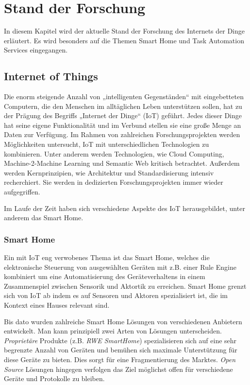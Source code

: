 \chapter{Stand der Forschung}
In diesem Kapitel wird der aktuelle Stand der Forschung des Internets der Dinge erläutert. Es wird besonders auf die Themen Smart Home und Task Automation Services eingegangen.


\section{Internet of Things}
Die enorm steigende Anzahl von „intelligenten Gegenständen“ mit eingebetteten Computern, die den Menschen im alltäglichen Leben unterstützen sollen, hat zu der Prägung des Begriffs „Internet der Dinge“ (IoT) geführt. Jedes dieser Dinge hat seine eigene Funktionalität und im Verbund stellen sie eine große Menge an Daten zur Verfügung. Im Rahmen von zahlreichen Forschungsprojekten \cite{ierc:portfolios} werden Möglichkeiten untersucht, IoT mit unterschiedlichen Technologien zu kombinieren. Unter anderem werden Technologien, wie Cloud Computing, Machine-2-Machine Learning und Semantic Web kritisch betrachtet. Außerdem werden Kernprinzipien, wie Architektur und Standardisierung intensiv recherchiert. Sie werden in dedizierten Forschungsprojekten \cite{icore:achitecture}\cite{iota:d25} immer wieder aufgegriffen.

Im Laufe der Zeit haben sich verschiedene Aspekte des IoT herausgebildet, unter anderem das Smart Home.

\subsection{Smart Home}
Ein mit IoT eng verwobenes Thema ist das Smart Home\cite{SmartHomeIoT}, welches die elektronische Steuerung von ausgewählten Geräten mit z.B. einer Rule Engine kombiniert um eine Automatisierung des Geräteverhaltens in einem Zusammenspiel zwischen Sensorik und Aktortik zu erreichen. Smart Home grenzt sich von IoT ab indem es auf Sensoren und Aktoren spezialisiert ist, die im Kontext eines Hauses relevant sind.

Bis dato wurden zahlreiche Smart Home Lösungen von verschiedenen Anbietern entwickelt. Man kann prinzipiell zwei Arten von Lösungen unterscheiden. \textit{Proprietäre} Produkte (z.B. \textit{RWE SmartHome}) spezialisieren sich auf eine sehr begrenzte Anzahl von Geräten und bemühen sich maximale Unterstützung für diese Geräte zu bieten. Dies sorgt für eine Fragmentierung des Marktes. \textit{Open Source} Lösungen hingegen verfolgen das Ziel möglichst offen für verschiedene Geräte und Protokolle zu bleiben. 

